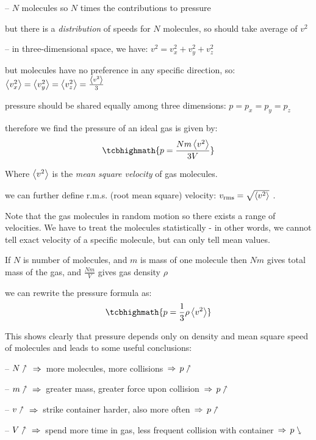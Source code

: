 \begin{compactitem}
	\item[--] $N$ molecules so $N$ times the contributions to pressure
	
	but there is a \emph{distribution} of speeds for $N$ molecules, so should take average of $v^2$
	
	\item[--] in three-dimensional space, we have: $v^2=v_x^2 + v_y^2 + v_z^2$
	
	but molecules have no preference in any specific direction, so: $\left< v_x^2 \right> = \left< v_y^2 \right> = \left< v_z^2 \right> = \frac{\left< v^2 \right>}{3}$
	
	pressure should be shared equally among three dimensions: $p=p_x=p_y=p_z$
		
\end{compactitem}


therefore we find the pressure of an ideal gas is given by: $$\tcbhighmath{p = \frac{Nm\avg{v^2}}{3V}}$$

\cmt Where $\left< v^2 \right>$ is the \emph{mean square velocity} of gas molecules.

we can further define r.m.s. (root mean square) velocity: $v_\text{rms} = \sqrt{\left< v^2 \right>}$ .

Note that the gas molecules in random motion so there exists a range of velocities. We have to treat the molecules statistically - in other words, we cannot tell exact velocity of a specific molecule, but can only tell mean values.

\cmt If $N$ is number of molecules, and $m$ is mass of one molecule then $Nm$ gives total mass of the gas, and $\frac{Nm}{V}$ gives gas density $\rho$

we can rewrite the pressure formula as: $$\tcbhighmath{p=\frac{1}{3}\rho \avg{v^2}}$$ 

This shows clearly that pressure depends only on density and mean square speed of molecules and leads to some useful conclusions:
\begin{compactitem}
\item[--] $N \nnearrow$ $\, \Rightarrow \,$ more molecules, more collisions $\, \Rightarrow \, p\nnearrow$

\item[--] $m \nnearrow$ $\, \Rightarrow \,$ greater mass, greater force upon collision $\, \Rightarrow \, p\nnearrow$

\item[--] $v \nnearrow$ $\, \Rightarrow \,$ strike container harder, also more often $\, \Rightarrow \, p\nnearrow$

\item[--] $V \nnearrow$ $\, \Rightarrow \,$ spend more time in gas, less frequent collision with container $\, \Rightarrow \, p\ssearrow$
\end{compactitem}


